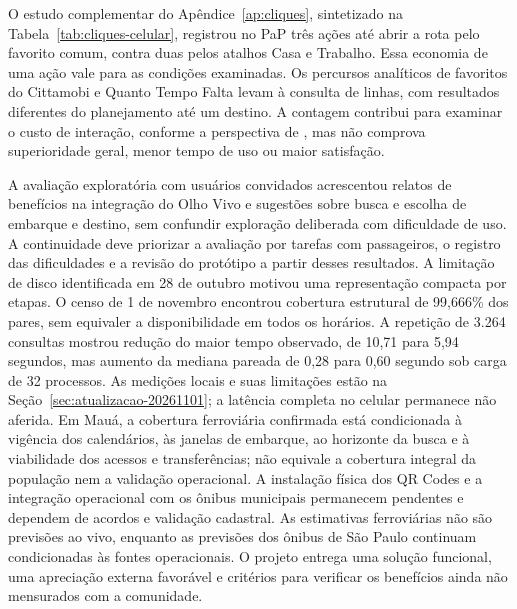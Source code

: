 \documentclass[12pt,oneside,a4paper,brazil,chapter=TITLE]{abntex2}
\begin{document}
O estudo complementar do Apêndice~\ref{ap:cliques}, sintetizado na Tabela~\ref{tab:cliques-celular}, registrou no PaP três ações até abrir a rota pelo favorito comum, contra duas pelos atalhos Casa e Trabalho. Essa economia de uma ação vale para as condições examinadas. Os percursos analíticos de favoritos do Cittamobi e Quanto Tempo Falta levam à consulta de linhas, com resultados diferentes do planejamento até um destino. A contagem contribui para examinar o custo de interação, conforme a perspectiva de \citet{card1980}, mas não comprova superioridade geral, menor tempo de uso ou maior satisfação.

A avaliação exploratória com usuários convidados acrescentou relatos de benefícios na integração do Olho Vivo e sugestões sobre busca e escolha de embarque e destino, sem confundir exploração deliberada com dificuldade de uso. A continuidade deve priorizar a avaliação por tarefas com passageiros, o registro das dificuldades e a revisão do protótipo a partir desses resultados. A limitação de disco identificada em 28 de outubro motivou uma representação compacta por etapas. O censo de 1 de novembro encontrou cobertura estrutural de 99,666\% dos pares, sem equivaler a disponibilidade em todos os horários. A repetição de 3.264 consultas mostrou redução do maior tempo observado, de 10,71 para 5,94 segundos, mas aumento da mediana pareada de 0,28 para 0,60 segundo sob carga de 32 processos. As medições locais e suas limitações estão na Seção~\ref{sec:atualizacao-20261101}; a latência completa no celular permanece não aferida. Em Mauá, a cobertura ferroviária confirmada está condicionada à vigência dos calendários, às janelas de embarque, ao horizonte da busca e à viabilidade dos acessos e transferências; não equivale a cobertura integral da população nem a validação operacional. A instalação física dos QR Codes e a integração operacional com os ônibus municipais permanecem pendentes e dependem de acordos e validação cadastral. As estimativas ferroviárias não são previsões ao vivo, enquanto as previsões dos ônibus de São Paulo continuam condicionadas às fontes operacionais. O projeto entrega uma solução funcional, uma apreciação externa favorável e critérios para verificar os benefícios ainda não mensurados com a comunidade.
\end{document}
